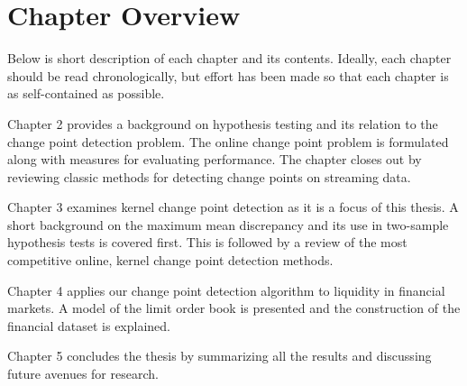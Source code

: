 \section{Chapter Overview}
Below is short description of each chapter and its contents. Ideally, each chapter should be read chronologically, but effort has been made so that each chapter is as self-contained as possible.

Chapter 2 provides a background on hypothesis testing and its relation to the change point detection problem. The online change point problem is formulated along with measures for evaluating performance. The chapter closes out by reviewing classic methods for detecting change points on streaming data.

Chapter 3 examines kernel change point detection as it is a focus of this thesis. A short background on the maximum mean discrepancy and its use in two-sample hypothesis tests is covered first. This is followed by a review of the most competitive online, kernel change point detection methods.

Chapter 4 applies our change point detection algorithm to liquidity in financial markets. A model of the limit order book is presented and the construction of the financial dataset is explained.

Chapter 5 concludes the thesis by summarizing all the results and discussing future avenues for research.